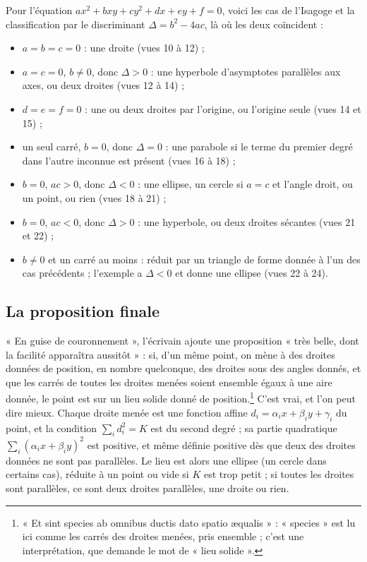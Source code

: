 \documentclass[11pt,a4paper]{article}
\begin{document}
Pour l'équation $ax^2 + bxy + cy^2 + dx + ey + f = 0$, voici les cas de
l'Isagoge et la classification par le discriminant $\Delta = b^2 - 4ac$, là où
les deux coïncident :
\begin{itemize}
  \item $a = b = c = 0$ : une droite (vues 10 à 12) ;
  \item $a = c = 0$, $b \neq 0$, donc $\Delta > 0$ : une hyperbole
    d'asymptotes parallèles aux axes, ou deux droites (vues 12 à 14) ;
  \item $d = e = f = 0$ : une ou deux droites par l'origine, ou l'origine
    seule (vues 14 et 15) ;
  \item un seul carré, $b = 0$, donc $\Delta = 0$ : une parabole si le terme du
    premier degré dans l'autre inconnue est présent (vues 16 à 18) ;
  \item $b = 0$, $ac > 0$, donc $\Delta < 0$ : une ellipse, un cercle si $a = c$
    et l'angle droit, ou un point, ou rien (vues 18 à 21) ;
  \item $b = 0$, $ac < 0$, donc $\Delta > 0$ : une hyperbole, ou deux droites
    sécantes (vues 21 et 22) ;
  \item $b \neq 0$ et un carré au moins : réduit par un triangle de forme
    donnée à l'un des cas précédents ; l'exemple a $\Delta < 0$ et donne une
    ellipse (vues 22 à 24).
\end{itemize}

\subsection*{La proposition finale}

« En guise de couronnement », l'écrivain ajoute une proposition « très belle,
dont la facilité apparaîtra aussitôt » : si, d'un même point, on mène à des
droites données de position, en nombre quelconque, des droites sous des angles
donnés, et que les carrés de toutes les droites menées soient ensemble égaux à
une aire donnée, le point est sur un lieu solide donné de position.\footnote{« Et
sint species ab omnibus ductis dato spatio æqualis » : « species » est lu ici
comme les carrés des droites menées, pris ensemble ; c'est une interprétation,
que demande le mot de « lieu solide ».} C'est vrai, et l'on peut dire mieux.
Chaque droite menée est une fonction affine $d_i = \alpha_i x + \beta_i y +
\gamma_i$ du point, et la condition $\sum_i d_i^2 = K$ est du second degré ; sa
partie quadratique $\sum_i(\alpha_i x + \beta_i y)^2$ est positive, et même
définie positive dès que deux des droites données ne sont pas parallèles. Le
lieu est alors une ellipse (un cercle dans certains cas), réduite à un point ou
vide si $K$ est trop petit ; si toutes les droites sont parallèles, ce sont deux
droites parallèles, une droite ou rien.
\end{document}
